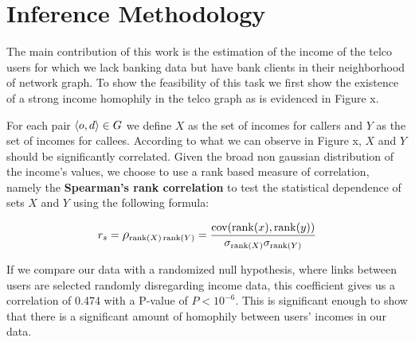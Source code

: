 \section{Inference Methodology}






The main contribution of this work is the estimation of the income of the telco users for which we lack banking data but have bank clients in their neighborhood of network graph. To show the feasibility of this task we first show the existence of a strong income homophily in the telco graph as is evidenced in Figure x.

For each pair \( \left< o, d \right> \in \mathlarger{G} \) we define \( X \) as the set of incomes for callers and \( Y \) as the set of incomes for callees. According to what we can observe in Figure x, \( X \) and \( Y \) should be significantly correlated. Given the broad non gaussian distribution of the income's values, we choose to use a rank based measure of correlation, namely the \textbf{Spearman's rank correlation} to test the statistical dependence of sets \( X \) and \( Y \) using the following formula: 

\[
r_s = \mathlarger{\rho}_{\operatorname{rank}(X) \operatorname{rank}(Y)} = \frac{\operatorname{cov}(\operatorname{rank}(x), \operatorname{rank}(y))}{\sigma_{\operatorname{rank}(X)} \sigma_{\operatorname{rank}(Y)}}
\]

If we compare our data with a randomized null hypothesis, where links between users are selected randomly disregarding income data, this coefficient gives us a correlation of \num{0.474} with a P-value of $ P < 10^{-6} $. This is significant enough to show that there is a significant amount of homophily between users' incomes in our data.

